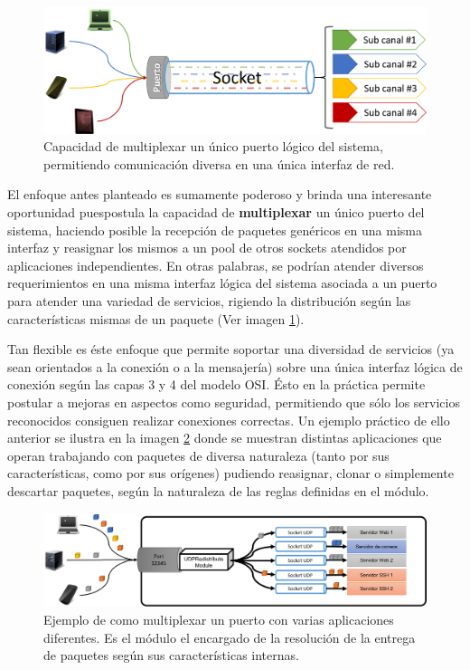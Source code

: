 \begin{figure}[!h]
	\centering
	\includegraphics[scale=.5]{imagenes/socketMultiplexed.png}
	\caption{Capacidad de multiplexar un único puerto lógico del sistema, permitiendo comunicación diversa en una única interfaz de red.}
	\label{fig:multiplexarPuerto}
\end{figure}

El enfoque antes planteado es sumamente poderoso y brinda una interesante oportunidad puespostula la capacidad de \textbf{multiplexar} un único puerto del sistema, haciendo posible la recepción de paquetes genéricos en una misma interfaz y reasignar los mismos a un pool de otros sockets atendidos por aplicaciones independientes. En otras palabras, se podrían atender diversos requerimientos en una misma interfaz lógica del sistema asociada a un puerto para atender una variedad de servicios, rigiendo la distribución según las características mismas de un paquete (Ver imagen \ref{fig:multiplexarPuerto}).

Tan flexible es éste enfoque que permite soportar una diversidad de servicios (ya sean orientados a la conexión o a la mensajería) sobre una única interfaz lógica de conexión según las capas 3 y 4 del modelo OSI. Ésto en la práctica permite postular a mejoras en aspectos como seguridad, permitiendo que sólo los servicios reconocidos consiguen realizar conexiones correctas. Un ejemplo práctico de ello anterior se ilustra en la imagen \ref{fig:multiplexarPuertoEjemplo} donde se muestran distintas aplicaciones que operan trabajando con paquetes de diversa naturaleza (tanto por sus características, como por sus orígenes) pudiendo reasignar, clonar o simplemente descartar paquetes, según la naturaleza de las reglas definidas en el módulo.

\begin{figure}[!h]
	\centering
	\includegraphics[scale=.6]{imagenes/udpredistributeapplications.png}
	\caption{Ejemplo de como multiplexar un puerto con varias aplicaciones diferentes. Es el módulo el encargado de la resolución de la entrega de paquetes según sus características internas.}
	\label{fig:multiplexarPuertoEjemplo}
\end{figure}
